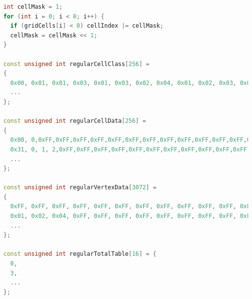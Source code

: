 \documentclass{article}
\begin{document}
\begin{lstlisting}[language=C++,label={tv_tables},caption={Calculation of \texttt{cellIndex}, and lookup tables for the geometry of regular cells in the Transvoxel algorithm. An example of their usage is given below.}]
int cellMask = 1;
for (int i = 0; i < 8; i++) {
  if (gridCells[i] < 0) cellIndex |= cellMask;
  cellMask = cellMask << 1;
}

const unsigned int regularCellClass[256] =
{
  0x00, 0x01, 0x01, 0x03, 0x01, 0x03, 0x02, 0x04, 0x01, 0x02, 0x03, 0x04, 0x03, 0x04, 0x04, 0x03,
  ...
};

const unsigned int regularCellData[256] =
{
  0x00, 0,0xFF,0xFF,0xFF,0xFF,0xFF,0xFF,0xFF,0xFF,0xFF,0xFF,0xFF,0xFF,0xFF,0xFF,
  0x31, 0, 1, 2,0xFF,0xFF,0xFF,0xFF,0xFF,0xFF,0xFF,0xFF,0xFF,0xFF,0xFF,0xFF,
  ...
};

const unsigned int regularVertexData[3072] =
{
  0xFF, 0xFF, 0xFF, 0xFF, 0xFF, 0xFF, 0xFF, 0xFF, 0xFF, 0xFF, 0xFF, 0xFF,
  0x01, 0x02, 0x04, 0xFF, 0xFF, 0xFF, 0xFF, 0xFF, 0xFF, 0xFF, 0xFF, 0xFF,
  ...
};

const unsigned int regularTotalTable[16] = {
  0,
  3,
  ...
};
\end{lstlisting}
\end{document}
